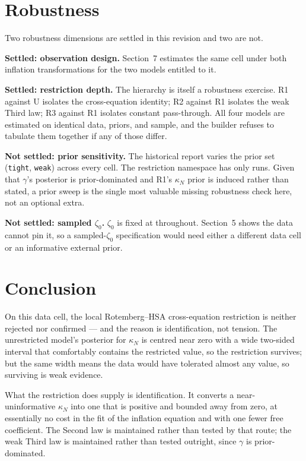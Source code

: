 \documentclass[11pt]{article}
\newcommand{\code}[1]{\texttt{#1}}
\begin{document}
\section{Robustness}
Two robustness dimensions are settled in this revision and two are not.

\textbf{Settled: observation design.} Section~7 estimates the same cell under
both inflation transformations for the two models entitled to it.

\textbf{Settled: restriction depth.} The hierarchy is itself a robustness
exercise. R1 against U isolates the cross-equation identity; R2 against R1
isolates the weak Third law; R3 against R1 isolates constant pass-through. All
four models are estimated on identical data, priors, and sample, and the builder
refuses to tabulate them together if any of those differ.

\textbf{Not settled: prior sensitivity.} The historical report varies the prior
set (\code{tight}, \code{weak}) across every cell. The restriction namespace has
only \code{\TheoryPriorSpec} runs. Given that $\gamma$'s posterior is
prior-dominated and R1's $\kappa_N$ prior is induced rather than stated, a
prior sweep is the single most valuable missing robustness check here, not an
optional extra.

\textbf{Not settled: sampled $\zeta_0$.} $\zeta_0$ is fixed at
\TheoryZetaZero{} throughout. Section~5 shows the data cannot pin it, so a
sampled-$\zeta_0$ specification would need either a different data cell or an
informative external prior.

\section{Conclusion}
On this data cell, the local Rotemberg--HSA cross-equation restriction is
neither rejected nor confirmed --- and the reason is identification, not
tension. The unrestricted model's posterior for $\kappa_N$ is centred near zero
with a wide two-sided interval that comfortably contains the restricted value,
so the restriction survives; but the same width means the data would have
tolerated almost any value, so surviving is weak evidence.

What the restriction does supply is identification. It converts a
near-uninformative $\kappa_N$ into one that is positive and bounded away from
zero, at essentially no cost in the fit of the inflation equation and with one
fewer free coefficient. The Second law is maintained rather than tested by that
route; the weak Third law is maintained rather than tested outright, since
$\gamma$ is prior-dominated.
\end{document}
